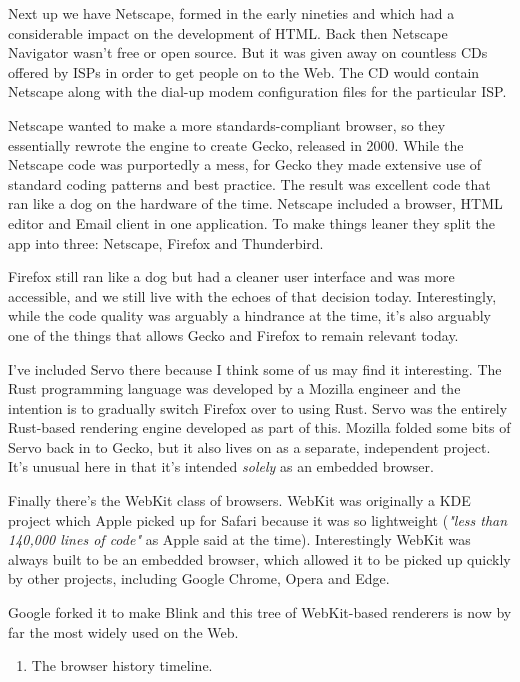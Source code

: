 \documentclass{article}
\begin{document}
Next up we have Netscape, formed in the early nineties and which had a considerable impact on the development of HTML. Back then Netscape Navigator wasn't free or open source. But it was given away on countless CDs offered by ISPs in order to get people on to the Web. The CD would contain Netscape along with the dial-up modem configuration files for the particular ISP.

Netscape wanted to make a more standards-compliant browser, so they essentially rewrote the engine to create Gecko, released in 2000. While the Netscape code was purportedly a mess, for Gecko they made extensive use of standard coding patterns and best practice. The result was excellent code that ran like a dog on the hardware of the time. Netscape included a browser, HTML editor and Email client in one application. To make things leaner they split the app into three: Netscape, Firefox and Thunderbird.

Firefox still ran like a dog but had a cleaner user interface and was more accessible, and we still live with the echoes of that decision today. Interestingly, while the code quality was arguably a hindrance at the time, it's also arguably one of the things that allows Gecko and Firefox to remain relevant today.

I've included Servo there because I think some of us may find it interesting. The Rust programming language was developed by a Mozilla engineer and the intention is to gradually switch Firefox over to using Rust. Servo was the entirely Rust-based rendering engine developed as part of this. Mozilla folded some bits of Servo back in to Gecko, but it also lives on as a separate, independent project. It's unusual here in that it's intended {\it solely\/} as an embedded browser.

Finally there's the WebKit class of browsers. WebKit was originally a KDE project which Apple picked up for Safari because it was so lightweight ({\it "less than 140,000 lines of code"\/} as Apple said at the time). Interestingly WebKit was always built to be an embedded browser, which allowed it to be picked up quickly by other projects, including Google Chrome, Opera and Edge.

Google forked it to make Blink and this tree of WebKit-based renderers is now by far the most widely used on the Web.
\begin{enumerate}
\item The browser history timeline.
\end{enumerate}
\end{document}

